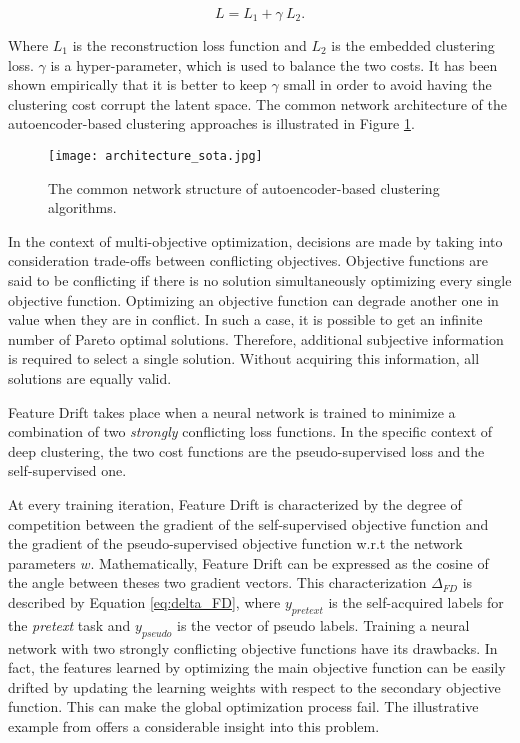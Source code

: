 \documentclass{article}
\begin{document}
\begin{equation}
    L = L_{1} + \gamma \: L_{2}.
\end{equation}

Where $L_{1}$ is the reconstruction loss function and $L_{2}$ is the embedded clustering loss. $\gamma$ is a hyper-parameter, which is used to balance the two costs. It has been shown empirically \cite{paper28} that it is better to keep $\gamma$ small in order to avoid having the clustering cost corrupt the latent space. The common network architecture of the autoencoder-based clustering approaches is illustrated in Figure \ref{fig:architecture_sota}.

\begin{figure}[ht]
\vskip 0.2in
\begin{center}
\centerline{\texttt{[image: architecture\_sota.jpg]}}
\caption{The common network structure of autoencoder-based clustering algorithms.}
\label{fig:architecture_sota}
\end{center}
\vskip -0.2in
\end{figure}

In the context of multi-objective optimization, decisions are made by taking into consideration trade-offs between conflicting objectives. Objective functions are said to be conflicting if there is no solution simultaneously optimizing every single objective function. Optimizing an objective function can degrade another one in value when they are in conflict. In such a case, it is possible to get an infinite number of Pareto optimal solutions. Therefore, additional subjective information is required to select a single solution. Without acquiring this information, all solutions are equally valid.

Feature Drift takes place when a neural network is trained to minimize a combination of two \textit{strongly} conflicting loss functions. In the specific context of deep clustering, the two cost functions are the pseudo-supervised loss and the self-supervised one. 

At every training iteration, Feature Drift is characterized by the degree of competition between the gradient of the self-supervised objective function and the gradient of the pseudo-supervised objective function w.r.t the network parameters $w$. Mathematically, Feature Drift can be expressed as the cosine of the angle between theses two gradient vectors. This characterization $\Delta_{FD}$ is described by Equation \ref{eq:delta_FD}, where $y_{pretext}$ is the self-acquired labels for the \textit{pretext} task and $y_{pseudo}$ is the vector of pseudo labels. Training a neural network with two strongly conflicting objective functions have its drawbacks. In fact, the features learned by optimizing the main objective function can be easily drifted by updating the learning weights with respect to the secondary objective function. This can make the global optimization process fail. The illustrative example from \cite{paper98} offers a considerable insight into this problem.
\end{document}
